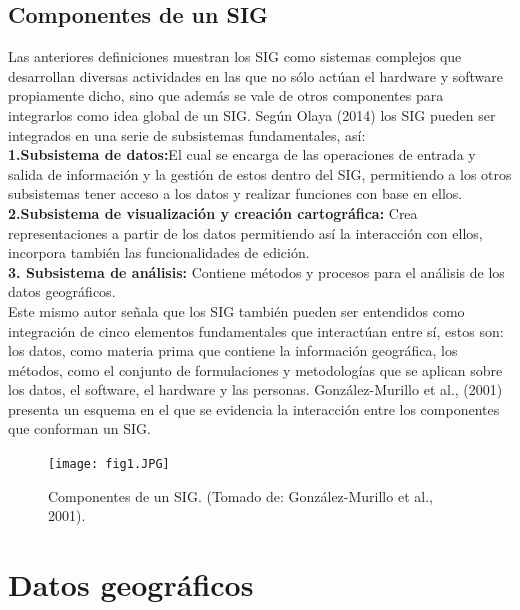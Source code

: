 \documentclass[12pt,hidelinks]{article}
\begin{document}
\subsection{Componentes de un SIG}
Las anteriores definiciones muestran los SIG como sistemas complejos que desarrollan
diversas actividades en las que no sólo actúan el hardware y software propiamente dicho, sino que
además se vale de otros componentes para integrarlos como idea global de un SIG. Según Olaya
(2014) los SIG pueden ser integrados en una serie de subsistemas fundamentales, así: \\[0.1 in]
\textbf{1.Subsistema de datos:}El cual se encarga de las operaciones de entrada y salida de
información y la gestión de estos dentro del SIG, permitiendo a los otros subsistemas tener
acceso a los datos y realizar funciones con base en ellos.\\[0.1 in]
\textbf{2.Subsistema de visualización y creación cartográfica: }Crea representaciones a partir de los
datos permitiendo así la interacción con ellos, incorpora también las funcionalidades de
edición.\\[0.1 in]
\textbf{3. Subsistema de análisis:} Contiene métodos y procesos para el análisis de los datos
geográficos.\\[0.1 in]
Este mismo autor señala que los SIG también pueden ser entendidos como integración de cinco
elementos fundamentales que interactúan entre sí, estos son: los datos, como materia prima que
contiene la información geográfica, los métodos, como el conjunto de formulaciones y metodologías
que se aplican sobre los datos, el software, el hardware y las personas. González-Murillo et al.,
(2001) presenta un esquema en el que se evidencia la interacción entre los componentes que
conforman un SIG.\\
\begin{figure}[H]
    \centering
    \texttt{[image: fig1.JPG]}
    \caption{Componentes de un SIG. (Tomado de: González-Murillo et al., 2001).}
    \label{fig:my_label}
\end{figure}
\section{Datos geográficos}
\end{document}
